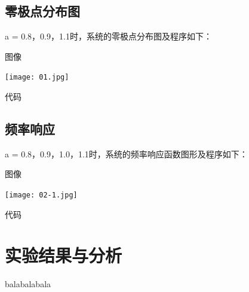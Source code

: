 \documentclass{zjureport}
\begin{document}
  \subsection{零极点分布图}
    a = 0.8，0.9，1.1时，系统的零极点分布图及程序如下：
    \begin{clause}
      \item 图像
      \begin{center}
        \texttt{[image: 01.jpg]}
      \end{center}
      \item 代码
      
    \end{clause}

  \subsection{频率响应}
    a = 0.8，0.9，1.0，1.1时，系统的频率响应函数图形及程序如下：
    \begin{clause}
      \item 图像
      \begin{center}
        \texttt{[image: 02-1.jpg]}
      \end{center}
      \item 代码
      
    \end{clause}

\section{实验结果与分析}

balabalabala
\end{document}

